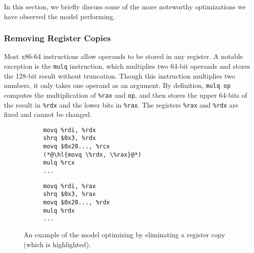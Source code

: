 \documentclass{article}
\begin{document}
In this section, we briefly discuss some of the more noteworthy optimizations we have observed the model performing.

\subsubsection{Removing Register Copies}
Most x86-64 instructions allow operands to be stored in any register.  A notable exception is the \lstinline{mulq} instruction, which multiplies two 64-bit operands and stores the 128-bit result without truncation.
%
Though this instruction multiplies two numbers, it only takes one operand as an argument.  By definition, \lstinline{mulq op} computes the multiplication of \lstinline{%rax} and \lstinline{op}, and then stores the upper 64-bits of the result in \lstinline{%rdx} and the lower bits in \lstinline{%rax}.  The registers \lstinline{%rax} and \lstinline{%rdx} are fixed and cannot be changed.
%


\begin{figure}
    \begin{subfigure}[t]{\codeboxwidth}
    \begin{lstlisting}[language={[x64]Assembler}]
movq %rdi, %rdx
shrq $0x3, %rdx
movq $0x20..., %rcx
(*@\hl{movq \%rdx, \%rax}@*)
mulq %rcx
...
\end{lstlisting}
    \caption{\ogcodecaption}
    \end{subfigure}
    \hfil
%
    \begin{subfigure}[t]{\codeboxwidth}
    \begin{lstlisting}
movq %rdi, %rax
shrq $0x3, %rax
movq $0x20..., %rdx
mulq %rdx
...
\end{lstlisting}
    \caption{\modelcodecaption}
    \end{subfigure}
    \centering
    \caption{An example of the model optimizing by eliminating a register copy (which is highlighted).}
    \label{fig:elim_copy}

\end{figure}
\end{document}

